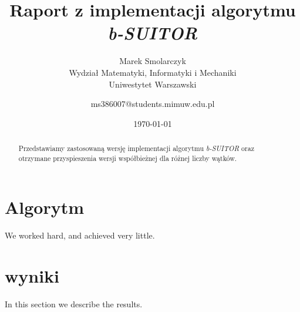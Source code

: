 \documentclass[12pt]{article}
\title{Raport z implementacji algorytmu \textit{b-SUITOR}}
\author{
        Marek Smolarczyk \\
                Wydział Matematyki, Informatyki i Mechaniki \\
                Uniwestytet Warszawski \\
            \and
        ms386007@students.mimuw.edu.pl
}
\date{\today}
\begin{document}
\maketitle

\begin{abstract}
Przedstawiamy zastosowaną wersję implementacji algorytmu \textit{b-SUITOR}
oraz otrzymane przyspieszenia wersji współbieżnej dla różnej liczby wątków.
\end{abstract}

\section{Algorytm}\label{algorytm}
We worked hard, and achieved very little.

\section{wyniki}\label{wyniki}
In this section we describe the results.



\end{document}
